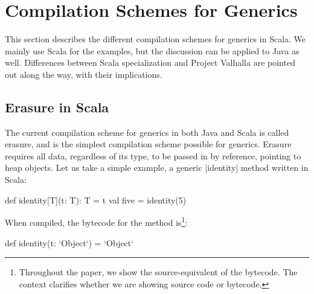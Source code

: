 \section{Compilation Schemes for Generics}
\label{sec:minibox}

This section describes the different compilation schemes for generics in Scala. We mainly use Scala for the examples, but the discussion can be applied to Java as well. Differences between Scala specialization and Project Valhalla are pointed out along the way, with their implications.

\subsection{Erasure in Scala}


The current compilation scheme for generics in both Java and Scala is called erasure, and is the simplest compilation scheme possible for generics. Erasure requires all data, regardless of its type, to be passed in by reference, pointing to heap objects. Let us take a simple example, a generic |identity| method written in Scala:

\begin{lstlisting-nobreak}
 def identity[T](t: T): T = t
 val five = identity(5)
\end{lstlisting-nobreak}

When compiled, the bytecode for the method is\footnote{Throughout the paper, we show the source-equivalent of the bytecode. The context clarifies whether we are showing source code or bytecode.}:

\begin{lstlisting-nobreak}
 def identity(t: `Object`) = `Object`
\end{lstlisting-nobreak}

